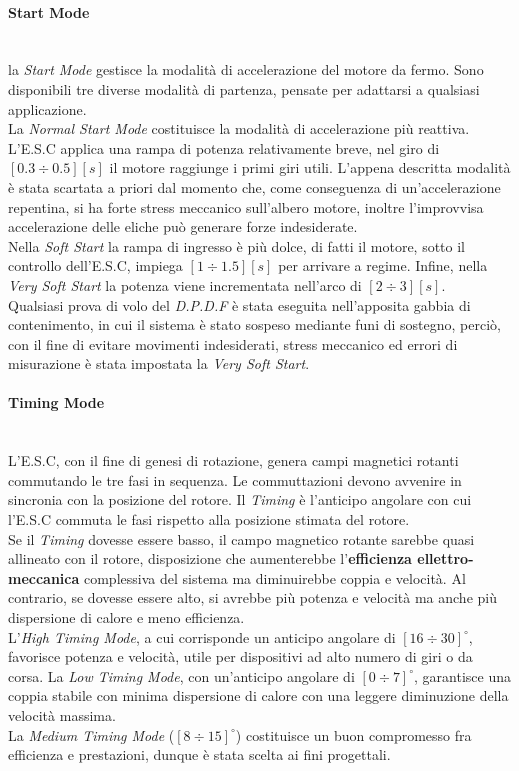 \paragraph{\small{Start Mode}}\mbox{}\\
la \textit{Start Mode} gestisce la modalità di accelerazione del motore da fermo. Sono disponibili tre diverse modalità di partenza, pensate per adattarsi a qualsiasi applicazione.\\
La \textit{Normal Start Mode} costituisce la modalità di accelerazione più reattiva. L'E.S.C applica una rampa di potenza relativamente breve, nel giro di $[0.3\div0.5] [s]$ il motore raggiunge i primi giri utili. L'appena descritta modalità è stata scartata a priori dal momento che, come conseguenza di un'accelerazione repentina, si ha forte stress meccanico sull'albero motore,
inoltre l'improvvisa accelerazione delle eliche può generare forze indesiderate.\\
Nella \textit{Soft Start} la rampa di ingresso è più dolce, di fatti il motore, sotto il controllo dell'E.S.C, impiega $[1\div1.5] [s]$ per arrivare a regime. Infine, nella \textit{Very Soft Start} la potenza viene incrementata nell'arco di $[2\div3] [s]$.\\
Qualsiasi prova di volo del \textit{D.P.D.F} è stata eseguita nell'apposita gabbia di contenimento, in cui il sistema è stato sospeso mediante funi di sostegno, perciò, con il fine di evitare movimenti indesiderati, stress meccanico ed errori di misurazione è stata impostata la \textit{Very Soft Start}.

\paragraph{\small{Timing Mode}}\mbox{}\\
L'E.S.C, con il fine di genesi di rotazione, genera campi magnetici rotanti commutando le tre fasi in sequenza. Le commuttazioni devono avvenire in sincronia con la posizione del rotore. Il \textit{Timing} è l'anticipo angolare con cui l'E.S.C commuta le fasi rispetto alla posizione stimata del rotore.\\
Se il \textit{Timing} dovesse essere basso, il campo magnetico rotante sarebbe quasi allineato con il rotore, disposizione che aumenterebbe l'\textbf{efficienza ellettro-meccanica} complessiva del sistema ma diminuirebbe coppia e velocità. Al contrario, se dovesse essere alto, si avrebbe più potenza e velocità ma anche più dispersione di calore e meno efficienza.\\
L'\textit{High Timing Mode}, a cui corrisponde un anticipo angolare di $[16\div30]^{\circ}$, favorisce potenza e velocità, utile per dispositivi ad alto numero di giri o da corsa. La \textit{Low Timing Mode}, con un'anticipo angolare di $[0\div7]^{\circ}$, garantisce una coppia stabile con minima dispersione di calore con una leggere diminuzione della velocità massima.\\
La \textit{Medium Timing Mode} ($[8\div15]^{\circ}$) costituisce un buon compromesso fra efficienza e prestazioni, dunque è stata scelta ai fini progettali.


